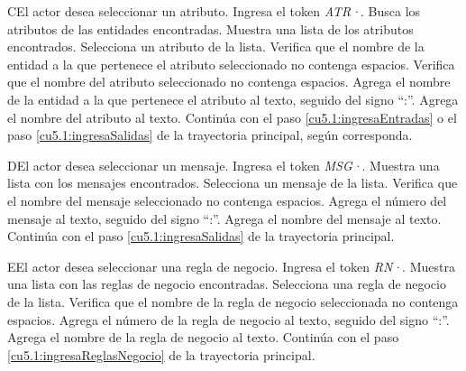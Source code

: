  \begin{UCtrayectoriaA}{C}{El actor desea seleccionar un atributo.}
 	\UCpaso[\UCactor] Ingresa el token {\it ATR·}.
  	\UCpaso[\UCsist] Busca los atributos de las entidades encontradas.
  	\UCpaso[\UCsist] Muestra una lista de los atributos encontrados.
 	\UCpaso[\UCactor] Selecciona un atributo de la lista.
  	\UCpaso[\UCsist] Verifica que el nombre de la entidad a la que pertenece el atributo seleccionado no contenga espacios. 
  	\UCpaso[\UCsist] Verifica que el nombre del atributo seleccionado no contenga espacios. 
  	\UCpaso[\UCsist] Agrega el nombre de la entidad a la que pertenece el atributo al texto, seguido del signo ``:''.
  	\UCpaso[\UCsist] Agrega el nombre del atributo al texto.
    \UCpaso[] Continúa con el paso \ref{cu5.1:ingresaEntradas} o el paso \ref{cu5.1:ingresaSalidas} de la trayectoria principal, según corresponda.
 \end{UCtrayectoriaA}
 \begin{UCtrayectoriaA}{D}{El actor desea seleccionar un mensaje.}
 	 \UCpaso[\UCactor] Ingresa el token {\it MSG·}.	
 	\UCpaso[\UCsist] Muestra una lista con los mensajes encontrados.
 	\UCpaso[\UCactor] Selecciona un mensaje de la lista.
  	\UCpaso[\UCsist] Verifica que el nombre del mensaje seleccionado no contenga espacios. 
  	\UCpaso[\UCsist] Agrega el número del mensaje al texto, seguido del signo ``:''.
  	\UCpaso[\UCsist] Agrega el nombre del mensaje al texto.
    \UCpaso[] Continúa con el paso \ref{cu5.1:ingresaSalidas} de la trayectoria principal.
 \end{UCtrayectoriaA}
 \begin{UCtrayectoriaA}{E}{El actor desea seleccionar una regla de negocio.}
 	\UCpaso[\UCactor] Ingresa el token {\it RN·}.	
 	\UCpaso[\UCsist] Muestra una lista con las reglas de negocio encontradas.
 	\UCpaso[\UCactor] Selecciona una regla de negocio de la lista.
  	\UCpaso[\UCsist] Verifica que el nombre de la regla de negocio seleccionada no contenga espacios. 
  	\UCpaso[\UCsist] Agrega el número de la regla de negocio al texto, seguido del signo ``:''.
  	\UCpaso[\UCsist] Agrega el nombre de la regla de negocio al texto.
    \UCpaso[] Continúa con el paso \ref{cu5.1:ingresaReglasNegocio} de la trayectoria principal.
 \end{UCtrayectoriaA}
